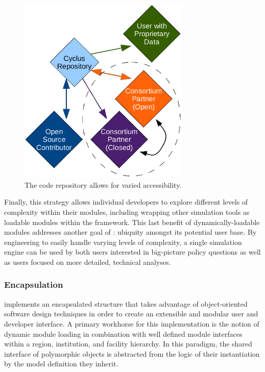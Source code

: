 \begin{figure}[hp!]
  \begin{center}
    \includegraphics[height=9cm]{./chapters/paradigm/openness.eps}
  \end{center}
  \caption{The \Cyclus code repository allows for varied accessibility.}
  \label{fig:repo}
\end{figure}

Finally, this strategy allows individual developers to
explore different levels of complexity within their modules, including
wrapping other simulation tools as loadable modules within the \Cyclus 
framework. This last benefit of dynamically-loadable modules addresses 
another goal of \Cyclus: ubiquity amongst its potential user base. By
engineering \Cyclus to easily handle varying levels of complexity, a single
simulation engine can be used by both users interested in big-picture policy
questions as well as users focused on more detailed, technical
analyses.

\subsubsection{Encapsulation}

\Cyclus implements an encapsulated structure that takes advantage of 
object-oriented software design techniques in order to create an 
extensible and modular user and developer interface. A primary 
workhorse for this implementation is the notion of dynamic module 
loading in combination with  well defined module interfaces within 
a region, institution, and facility  hierarchy. In this paradigm, 
the shared interface of polymorphic objects is abstracted from the 
logic of their instantiation by the model definition they inherit.  

